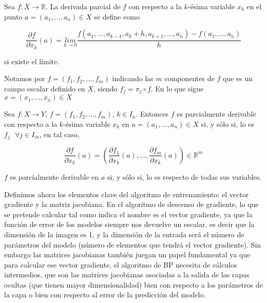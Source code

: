 \begin{definicion}
           

	Sea $f: X \rightarrow \mathbb{R}$. La derivada parcial de $f$ con respecto a la $k$-ésima variable $x_k$ en el punto $a = (a_1, \ldots, a_n)\in X$ se define como

	$$ \frac{\partial f}{\partial x_k}(a) = \underset{h\rightarrow0}{lim}\frac{f(a_1, \ldots, a_{k-1}, a_k + h, a_{k+1}, \ldots, a_n) - f(a_1, \ldots, a_n)}{h}$$

	si existe el límite.
\end{definicion}

Notamos por $f= \left ( f_1,f_2,\ldots, f_m \right )$ indicando las $m$ componentes de $f$ que es un campo escalar definido en $X$, siendo $f_j=\pi _j \circ f$.  En lo que sigue $x = \left ( x_1, \ldots, x_n  \right )  \in X$


\begin{definicion}
        Sea $f: X \rightarrow Y$,  $f=(f_1, f_2, \ldots, f_m)$, $k \in I_n$. Entonces $f$ es parcialmente derivable con respecto a la $k$-ésima variable $x_k$ en $a = (a_1, \ldots, a_n)\in X$ si, y sólo si, lo es $f_j \textrm{ } \forall j \in I_m$, en tal caso, 

        $$\frac{\partial f}{\partial x_k}(a) = \left ( \frac{\partial f_1}{\partial x_k}(a), \ldots, \frac{\partial f_m}{\partial x_k}(a) \right ) \in \mathbb{R}^m$$

        $f$ es parcialmente derivable en $a$ si, y sólo si, lo es respecto de todas sus variables.
\end{definicion}


Definimos ahora los elementos clave del algoritmo de entrenamiento: el vector gradiente y la matriz jacobiana. En el algoritmo de descenso de gradiente, lo que se pretende calcular tal como indica el nombre es el vector gradiente, ya que la función de error de los modelos siempre nos devuelve un escalar, es decir que la dimensión de la imagen es 1, y la dimensión de la entrada será el número de parámetros del modelo (número de elementos que tendrá el vector gradiente). Sin embargo las matrices jacobianas también juegan un papel fundamental ya que para calcular ese vector gradiente, el algoritmo de BP necesita de cálculos intermedios, que son las matrices jacobianas asociadas a la salida de las capas ocultas (que tienen mayor dimensionalidad) bien con respecto a los parámetros de la capa o bien con respecto al error de la predicción del modelo.

